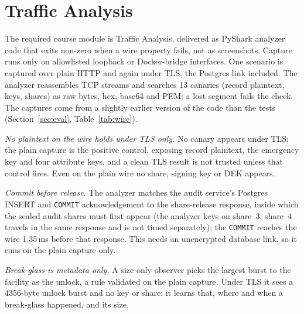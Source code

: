 \section{Traffic Analysis}\label{sec:traffic}

The required course module is Traffic Analysis, delivered as PyShark analyzer
code that exits non-zero when a wire property fails, not as screenshots.
Capture runs only on allowlisted loopback or Docker-bridge interfaces.
One scenario is captured over plain HTTP and again under TLS, the Postgres
link included.
The analyzer reassembles TCP streams and searches 13 canaries (record
plaintext, keys, shares) as raw bytes, hex, base64 and PEM; a lost segment
fails the check.
The captures come from a slightly earlier version of the code than the
tests (Section~\ref{sec:eval}, Table~\ref{tab:wire}).



\emph{No plaintext on the wire holds under TLS only.}
No canary appears under TLS; the plain capture is the positive control,
exposing record plaintext, the emergency key and four attribute keys, and a
clean TLS result is not trusted unless that control fires.
Even on the plain wire no share, signing key or DEK appears.

\emph{Commit before release.} The analyzer matches the audit service's
Postgres INSERT and \texttt{COMMIT} acknowledgement to the
share-release response, inside which the sealed audit shares
must first appear (the analyzer keys on share~3; share~4 travels in the same
response and is not timed separately); the \texttt{COMMIT} reaches the wire
1.35\,ms before that response.
This needs an unencrypted database link, so it runs on the plain capture
only.

\emph{Break-glass is metadata only.} A size-only observer picks the largest
burst to the facility as the unlock, a rule validated on the plain capture.
Under TLS it sees a 4356-byte unlock burst and no key or share: it learns
that, where and when a break-glass happened, and its size.

